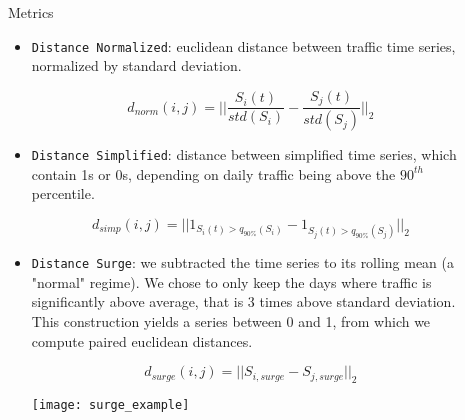 \documentclass[final]{beamer}
\newlength{\sepwid}
\newlength{\onecolwid}
\newlength{\twocolwid}
\begin{document}
\begin{frame}[t]
\begin{columns}[t]
\begin{column}{\onecolwid}
\end{column} %

\begin{column}{\sepwid}\end{column} %

\begin{column}{\twocolwid} %

\begin{columns}[t,totalwidth=\twocolwid] %

\begin{column}{\onecolwid}\vspace{-.6in} %


\begin{block}{Metrics}

  \begin{itemize}
  \item \texttt{Distance Normalized}: euclidean distance between traffic time series, normalized by standard deviation.

  $$d_{norm}(i, j) = ||\frac{S_i(t)}{std(S_i)} - \frac{S_j(t)}{std(S_j)}||_2$$

  \item \texttt{Distance Simplified}: distance between simplified time series, which contain 1s or 0s, depending on daily traffic being above the $90^{th}$ percentile.

  $$d_{simp}(i, j) = ||1_{S_i(t) > q_{90\%}(S_i)} - 1_{S_j(t) > q_{90\%}(S_j)}||_2$$

  \item \texttt{Distance Surge}: we subtracted the time series to its rolling mean (a "normal" regime). We chose to only keep the days where traffic is significantly above average, that is 3 times above standard deviation. This construction yields a series between 0 and 1, from which we compute paired euclidean distances.


  $$d_{surge}(i, j) = ||S_{i, surge} - S_{j, surge}||_2$$

  \begin{center}
    \texttt{[image: surge\_example]}
  \end{center}
\end{itemize}


\end{block}
\end{column}
\end{columns}
\end{column}
\end{columns}
\end{frame}
\end{document}
